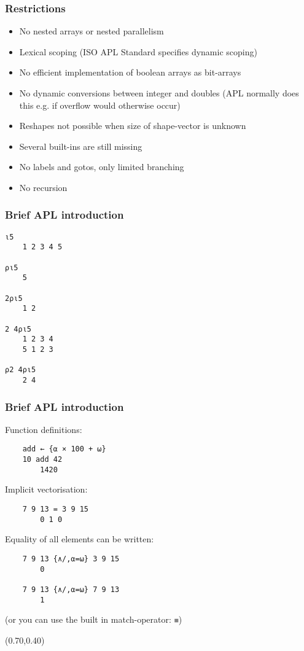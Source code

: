 \documentclass{beamer}
\begin{document}
\begin{frame}
\frametitle{Restrictions}
\begin{itemize}
\item No nested arrays or nested parallelism
\item Lexical scoping (ISO APL Standard specifies dynamic scoping)
\item No efficient implementation of boolean arrays as bit-arrays
\item No dynamic conversions between integer and doubles (APL normally
  does this e.g. if overflow would otherwise occur)
\item Reshapes not possible when size of shape-vector is unknown
\item Several built-ins are still missing
\item No labels and gotos, only limited branching
\item No recursion
\end{itemize}
\end{frame}

\begin{frame}[fragile]
\frametitle{Brief APL introduction}


\begin{verbatim}
⍳5
    1 2 3 4 5

⍴⍳5
    5

2⍴⍳5
    1 2

2 4⍴⍳5
    1 2 3 4
    5 1 2 3

⍴2 4⍴⍳5
    2 4
\end{verbatim}

\end{frame}

\begin{frame}[fragile]
\frametitle{Brief APL introduction}

Function definitions:
\begin{verbatim}
    add ← {⍺ × 100 + ⍵}
    10 add 42
        1420
\end{verbatim}

Implicit vectorisation:
\begin{verbatim}
    7 9 13 = 3 9 15
        0 1 0
\end{verbatim}

\pause
Equality of all elements can be written:
\begin{verbatim}
    7 9 13 {∧/,⍺=⍵} 3 9 15
        0

    7 9 13 {∧/,⍺=⍵} 7 9 13
        1
\end{verbatim}
(or you can use the built in match-operator: \verb|≡|)

\begin{textblock*}{40mm}(0.70\textwidth,0.40\textheight)
\end{textblock*}

\end{frame}
\end{document}
